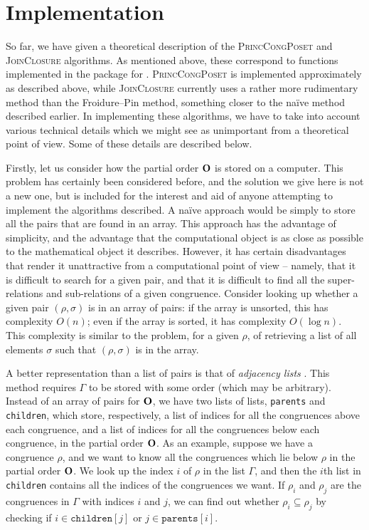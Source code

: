 \section{Implementation}
\label{sec:lattice-implementation}

So far, we have given a theoretical description of the \textsc{PrincCongPoset}
and \textsc{JoinClosure} algorithms.  As mentioned above, these correspond to
functions implemented in the \Semigroups{} package \cite{semigroups} for \GAP{}
\cite{gap}.  \textsc{PrincCongPoset} is implemented approximately as described
above, while \textsc{JoinClosure} currently uses a rather more rudimentary
method than the Froidure--Pin method, something closer to the na\"ive method
described earlier.  In implementing these algorithms, we have to take into
account various technical details which we might see as unimportant from a
theoretical point of view.  Some of these details are described below.

Firstly, let us consider how the partial order $\mathbf{O}$ is stored on a computer.
This problem has certainly been considered before, and the solution we give here
is not a new one, but is included for the interest and aid of anyone attempting
to implement the algorithms described.  A na\"ive approach would be simply to
store all the pairs that are found in an array.  This approach has the advantage
of simplicity, and the advantage that the computational object is as close as
possible to the mathematical object it describes.  However, it has certain
disadvantages that render it unattractive from a computational point of
view -- namely, that it is difficult to search for a given pair, and that it is
difficult to find all the super-relations and sub-relations of a given
congruence.  Consider looking up whether a given pair $(\rho,\sigma)$ is in an
array of pairs: if the array is unsorted, this has complexity $O(n)$; even if
the array is sorted, it has complexity $O(\log n)$.  This complexity is similar
to the problem, for a given $\rho$, of retrieving a list of all elements
$\sigma$ such that $(\rho, \sigma)$ is in the array.

A better representation than a list of pairs is that of \textit{adjacency lists}
\cite{adj_list}.  This method requires $\Gamma$ to be stored with some
order (which may be arbitrary).  Instead of an array of pairs for $\mathbf{O}$, we have
two lists of lists, \texttt{parents} and \texttt{children}, which store,
respectively, a list of indices for all the congruences above each congruence,
and a list of indices for all the congruences below each congruence, in the
partial order $\mathbf{O}$.  As an example, suppose we have a congruence $\rho$, and we
want to know all the congruences which lie below $\rho$ in the partial order
$\mathbf{O}$.  We look up the index $i$ of $\rho$ in the list $\Gamma$, and then the
$i$th list in \texttt{children} contains all the indices of the congruences we
want.  If $\rho_i$ and $\rho_j$ are the congruences in $\Gamma$ with indices $i$
and $j$, we can find out whether $\rho_i \subseteq \rho_j$ by checking if
$i \in \mathtt{children}[j]$ or $j \in \mathtt{parents}[i]$.

